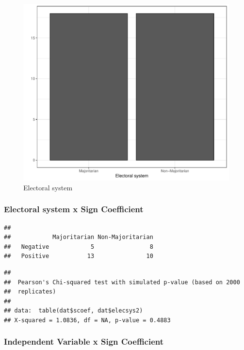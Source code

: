 \documentclass[
]{article}
\begin{document}
\begin{figure}
\centering
\includegraphics{appendixV5_files/figure-latex/unnamed-chunk-11-1.pdf}
\caption{Electoral system}
\end{figure}

\newpage

\hypertarget{electoral-system-x-sign-coefficient}{%
\subsubsection{Electoral system x Sign
Coefficient}\label{electoral-system-x-sign-coefficient}}

\begin{verbatim}
##           
##            Majoritarian Non-Majoritarian
##   Negative            5                8
##   Positive           13               10
\end{verbatim}

\begin{verbatim}
## 
##  Pearson's Chi-squared test with simulated p-value (based on 2000
##  replicates)
## 
## data:  table(dat$scoef, dat$elecsys2)
## X-squared = 1.0836, df = NA, p-value = 0.4883
\end{verbatim}

\newpage

\hypertarget{independent-variable-x-sign-coefficient}{%
\subsubsection{Independent Variable x Sign
Coefficient}\label{independent-variable-x-sign-coefficient}}
\end{document}
